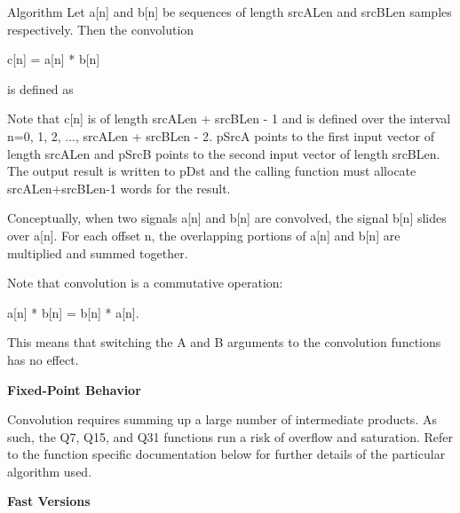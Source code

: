 \begin{DoxyParagraph}{Algorithm}
Let {\ttfamily a\mbox{[}n\mbox{]}} and {\ttfamily b\mbox{[}n\mbox{]}} be sequences of length {\ttfamily src\+A\+Len} and {\ttfamily src\+B\+Len} samples respectively. Then the convolution
\end{DoxyParagraph}

\begin{DoxyPre}
                  c[n] = a[n] * b[n]
\end{DoxyPre}


\begin{DoxyParagraph}{}
is defined as  
\end{DoxyParagraph}
\begin{DoxyParagraph}{}
Note that {\ttfamily c\mbox{[}n\mbox{]}} is of length {\ttfamily src\+A\+Len + src\+B\+Len -\/ 1} and is defined over the interval {\ttfamily n=0, 1, 2, ..., src\+A\+Len + src\+B\+Len -\/ 2}. {\ttfamily p\+SrcA} points to the first input vector of length {\ttfamily src\+A\+Len} and {\ttfamily p\+SrcB} points to the second input vector of length {\ttfamily src\+B\+Len}. The output result is written to {\ttfamily p\+Dst} and the calling function must allocate {\ttfamily src\+A\+Len+src\+B\+Len-\/1} words for the result.
\end{DoxyParagraph}
\begin{DoxyParagraph}{}
Conceptually, when two signals {\ttfamily a\mbox{[}n\mbox{]}} and {\ttfamily b\mbox{[}n\mbox{]}} are convolved, the signal {\ttfamily b\mbox{[}n\mbox{]}} slides over {\ttfamily a\mbox{[}n\mbox{]}}. For each offset {\ttfamily n}, the overlapping portions of a\mbox{[}n\mbox{]} and b\mbox{[}n\mbox{]} are multiplied and summed together.
\end{DoxyParagraph}
\begin{DoxyParagraph}{}
Note that convolution is a commutative operation\+:
\end{DoxyParagraph}

\begin{DoxyPre}
                  a[n] * b[n] = b[n] * a[n].
\end{DoxyPre}


\begin{DoxyParagraph}{}
This means that switching the A and B arguments to the convolution functions has no effect.
\end{DoxyParagraph}
{\bfseries Fixed-\/\+Point Behavior}

\begin{DoxyParagraph}{}
Convolution requires summing up a large number of intermediate products. As such, the Q7, Q15, and Q31 functions run a risk of overflow and saturation. Refer to the function specific documentation below for further details of the particular algorithm used.
\end{DoxyParagraph}
{\bfseries Fast Versions}

